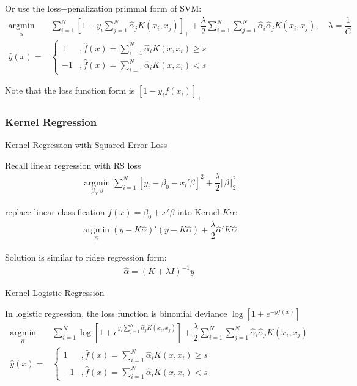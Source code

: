     Or use the loss+penalization primmal form of SVM:
    \begin{align}
        \mathop{\arg\min}\limits_{\hat{\alpha } }&\sum_{i=1}^N\left[ 1-y_i\sum_{j=1}^N\hat{\alpha }_jK(x_i,x_j) \right]_++\dfrac{\lambda }{2}\sum_{i=1}^N\sum_{j=1}^N\hat{\alpha }_i\hat{\alpha }_jK(x_i,x_j),\quad \lambda =\dfrac{1}{C} \\
        \hat{y}(x)=&\begin{cases}
            1 &,\hat{f}(x)=\sum_{i=1}^N\hat{\alpha }_iK(x,x_i)\geq s\\
            -1&,\hat{f}(x)=\sum_{i=1}^N\hat{\alpha }_iK(x,x_i)<s
        \end{cases}
    \end{align}
    
    Note that the loss function form is $ [1-y_if(x_i)]_+ $
    
    
\subsubsection{Kernel Regression}
\begin{point}
    Kernel Regression with Squared Error Loss
\end{point}

     Recall linear regression with RS loss
     \begin{align}
        \mathop{\arg\min}\limits_{\beta_0,\beta  }\sum_{i=1}^N\left[ y_i-\beta _0-x_i'\beta  \right]^2+\dfrac{\lambda }{2}\left\Vert \beta \right\Vert^2_2
     \end{align}

     replace linear classification $ f(x)=\beta _0+x'\beta  $ into Kernel $ K\alpha  $:
     \begin{align}
        \mathop{\arg\min}\limits_{\hat{\alpha }}(y-K\hat{\alpha } )'(y-K\hat{\alpha } ) +\dfrac{\lambda }{2}\hat{\alpha } 'K\hat{\alpha } 
     \end{align}

     Solution is similar to ridge regression form:
     \begin{align}
        \hat{\alpha }=(K+\lambda I)^{-1}y 
     \end{align}     

\begin{point}
    Kernel Logistic Regression
\end{point}

    In logistic regression, the loss function is binomial deviance $ \log\left[1+e^{-yf(x)}\right] $
    \begin{align}
        \mathop{\arg\min}\limits_{\hat{\alpha } }&\sum_{i=1}^N\log \left[1+e^{y_i\sum_{j=1}^N\hat{\alpha }_jK(x_i,x_j)}\right]+\dfrac{\lambda }{2}\sum_{i=1}^N\sum_{j=1}^N  \hat{\alpha }_i\hat{\alpha }_jK(x_i,x_j)\\
        \hat{y}(x)=&\begin{cases}
            1 &,\hat{f}(x)=\sum_{i=1}^N\hat{\alpha }_iK(x,x_i)\geq s\\
            -1&,\hat{f}(x)=\sum_{i=1}^N\hat{\alpha }_iK(x,x_i)<s
        \end{cases}
    \end{align}
    

